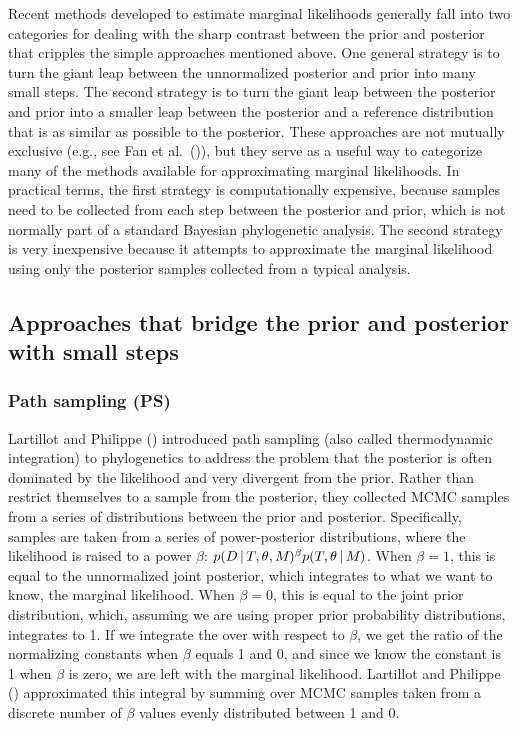 Recent methods developed to estimate marginal likelihoods generally fall into
two categories for dealing with the sharp contrast between the prior and
posterior that cripples the simple approaches mentioned above.
One general strategy is to turn the giant leap between the unnormalized
posterior and prior into many small steps.
The second strategy is to turn the giant leap between the posterior and prior
into a smaller leap between the posterior and a reference distribution that is
as similar as possible to the posterior.
These approaches are not mutually exclusive (e.g., see Fan et al.\
(\citeyear{Fan2011})), but they serve as a useful way to categorize many of the
methods available for approximating marginal likelihoods.
In practical terms, the first strategy is computationally expensive, because
samples need to be collected from each step between the posterior and prior,
which is not normally part of a standard Bayesian phylogenetic analysis.
The second strategy is very inexpensive because it attempts to approximate the
marginal likelihood using only the posterior samples collected from a
typical analysis.

\subsection{Approaches that bridge the prior and posterior with small steps}

\subsubsection{Path sampling (PS)}
Lartillot and Philippe (\citeyear{Lartillot2006}) introduced path sampling
(also called thermodynamic integration) to phylogenetics to address the problem
that the posterior is often dominated by the likelihood and very divergent from
the prior.
Rather than restrict themselves to a sample from the posterior, they collected
MCMC samples from a series of distributions between the prior and posterior.
Specifically, samples are taken from a series of power-posterior distributions,
where the likelihood is raised to a power $\beta$:
$ p(D \,|\, T, \theta_{}, M_{})^{\beta}
p(T, \theta_{} \,|\, M_{})$.
When $\beta = 1$, this is equal to the unnormalized joint posterior, which
integrates to what we want to know, the marginal likelihood.
When $\beta = 0$, this is equal to the joint prior distribution, which,
assuming we are using proper prior probability distributions, integrates to 1.
If we integrate the  
over \vmadd{the interval (0--1)} with respect to $\beta$, we get
the ratio of the normalizing constants when $\beta$ equals 1 and 0, and since
we know the constant is 1 when $\beta$ is zero, we are left with the marginal
likelihood.
Lartillot and Philippe (\citeyear{Lartillot2006}) approximated this integral by
summing over MCMC samples taken from a discrete number of $\beta$ values evenly
distributed between 1 and 0.

